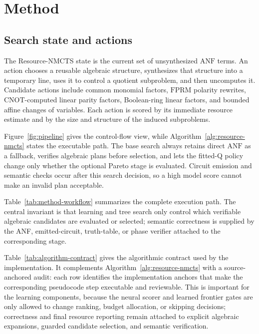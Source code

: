\documentclass[11pt]{article}
\newcommand{\method}{Resource-NMCTS}
\newcommand{\anf}{\ensuremath{\mathrm{ANF}}}
\newcommand{\fprm}{\ensuremath{\mathrm{FPRM}}}
\begin{document}
\section{Method}

\subsection{Search state and actions}

The \method{} state is the current set of unsynthesized \anf{} terms.  An
action chooses a reusable algebraic structure, synthesizes that structure into
a temporary line, uses it to control a quotient subproblem, and then
uncomputes it.  Candidate actions include common monomial factors, \fprm{}
polarity rewrites, CNOT-computed linear parity factors, Boolean-ring linear
factors, and bounded affine changes of variables.  Each action is scored by
its immediate resource estimate and by the size and structure of the induced
subproblems.

Figure~\ref{fig:pipeline} gives the control-flow view, while
Algorithm~\ref{alg:resource-nmcts} states the executable path.  The base search
always retains direct \anf{} as a fallback, verifies algebraic plans before
selection, and lets the fitted-Q policy change only whether the optional Pareto
stage is evaluated.  Circuit emission and semantic checks occur after this
search decision, so a high model score cannot make an invalid plan acceptable.



Table~\ref{tab:method-workflow} summarizes the complete execution path.  The
central invariant is that learning and tree search only control which
verifiable algebraic candidates are evaluated or selected; semantic correctness
is supplied by the ANF, emitted-circuit, truth-table, or phase verifier attached
to the corresponding stage.

\begin{table}[H]
\centering
\scriptsize
\setlength{\tabcolsep}{2pt}
\renewcommand{\arraystretch}{1.05}
\caption{End-to-end synthesis and verification workflow.  Each stage records
the mechanism used by \method{}, the invariant that prevents the learned search
from becoming a semantic oracle, and the artifact produced for downstream
analysis.}
\label{tab:method-workflow}

\end{table}

Table~\ref{tab:algorithm-contract} gives the algorithmic contract used by the
implementation.  It complements Algorithm~\ref{alg:resource-nmcts} with a
source-anchored audit: each row identifies the implementation anchors that make
the corresponding pseudocode step executable and reviewable.  This is
important for the learning components, because the neural scorer and learned
frontier gates are only allowed to change ranking, budget allocation, or
skipping decisions; correctness and final resource reporting remain attached
to explicit algebraic expansions, guarded candidate selection, and semantic
verification.
\end{document}
